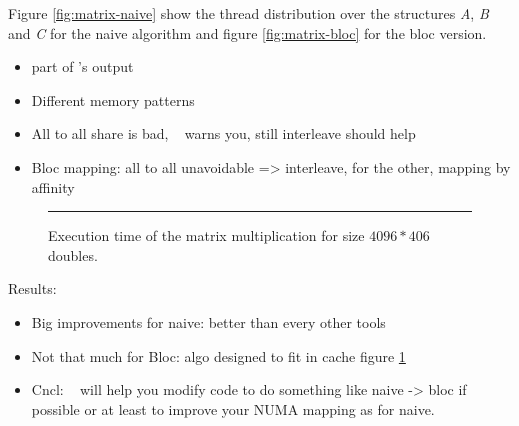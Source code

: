 Figure \ref{fig:matrix-naive} show the thread distribution over the
structures \emph{A}, \emph{B} and \emph{C} for the naive algorithm and figure
\ref{fig:matrix-bloc} for the bloc version.
\begin{itemize}
    \item part of \TABARNAC's output
    \item Different memory patterns
    \item All to all share is bad, \TABARNAC~ warns you, still interleave
        should help
    \item Bloc mapping: all to all unavoidable => interleave, for the other,
        mapping by affinity
\end{itemize}

\begin{figure}[htb]
    \centering
    \rule{4cm}{4cm}
    \caption{Execution time of the matrix multiplication for size $4096*406$ doubles.}
    \label{fig:matrix-res}
\end{figure}

Results:
\begin{itemize}
    \item Big improvements for naive: better than every other tools
    \item Not that much for Bloc: algo designed to fit in cache figure
        \ref{fig:matrix-res}
    \item Cncl: \TABARNAC~ will help you modify code to do something like naive
        -> bloc if possible or at least to improve your NUMA mapping as for
        naive.
\end{itemize}

